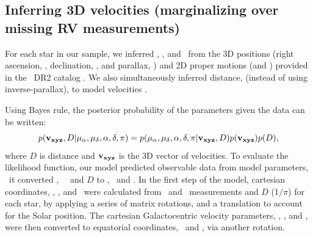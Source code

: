 \subsection{Inferring 3D velocities (marginalizing over missing RV
measurements)}
\label{sec:inference}

For each star in our sample, we inferred \vx, \vy, and \vz\ from the 3D
positions (right ascension, \ra, declination, \dec, and parallax, \parallax)
and 2D proper motions (\mura and \mudec) provided in the \gaia\ DR2 catalog
\citep{brown2011}.
We also simultaneously inferred distance, (instead of using inverse-parallax),
to model velocities \citep[see \eg][]{bailer-jones2015, bailer-jones2018}.

Using Bayes rule, the posterior probability of the parameters given the data
can be written:
\begin{equation}
    p({\bf v_{xyz}}, D | \mu_{\alpha}, \mu_{\delta}, \alpha, \delta, \pi) =
    p(\mu_{\alpha}, \mu_{\delta}, \alpha, \delta, \pi | {\bf v_{xyz}}, D)
    p({\bf v_{xyz}}) p(D),
\end{equation}
where $D$ is distance and ${\bf v_{xyz}}$ is the 3D vector of velocities.
To evaluate the likelihood function, our model predicted observable data from
model parameters, \ie\ it converted \vx, \vy\, \vz\ and $D$ to \pmra, \pmdec\
and \parallax.
In the first step of the model, cartesian coordinates, \x, \y, and \z\, were
calculated from \ra\ and \dec\ measurements and $D$ ($1/\pi$) for each star,
by applying a series of matrix rotations, and a translation to account for the
Solar position.
The cartesian Galactocentric velocity parameters, \vx, \vy, and \vz, were then
converted to equatorial coordinates, \pmra\ and \pmdec, via another rotation.

